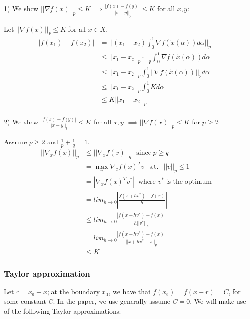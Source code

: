 \documentclass{article}
\begin{document}
1) We show $||\nabla f(x)||_p \leq K \implies \frac{|f(x)-f(y)|}{||x-y||_p} \leq K$ for all $x,y$:

Let $||\nabla f(x)||_p \leq K$ for all $x \in X$.
\begin{align*}
|f(x_1)-f(x_2)| &= || (x_1-x_2) \int_{0}^{1} \nabla f(\tilde{x}(\alpha)) d\alpha ||_p \\
&\leq || x_1-x_2 ||_p \cdot ||_p \int_{0}^{1} \nabla f(\tilde{x}(\alpha)) d\alpha || \\
&\leq || x_1-x_2 ||_p \int_{0}^{1} ||\nabla f(\tilde{x}(\alpha))||_p d\alpha \\
&\leq || x_1-x_2 ||_p \int_{0}^{1} K d\alpha \\
&\leq K || x_1-x_2 ||_p \\
\end{align*}

2) We show $\frac{|f(x)-f(y)|}{||x-y||_p} \leq K$ for all $x,y$ $\implies || \nabla f(x)||_p \leq K$ for $p\ge2$:

Assume $p\ge 2$ and $\frac{1}{p}+\frac{1}{q}=1$.
\begin{align*}
|| \nabla_x f(x) ||_p &\leq || \nabla_x f(x) ||_q \hspace{5pt} \text{ since $p \ge q$} \\
&= \max_v \nabla_x f(x)^T v \hspace{5pt} \text{ s.t. } \hspace{5pt} ||v||_p \leq 1 \\
&= \left| \nabla_x f(x)^T v^{*} \right| \hspace{3pt} \text{ where $v^{*}$ is the optimum} \\
&= lim_{h\to 0} \left|  \frac{f(x+hv^{*})-f(x)}{h} \right|  \\
&\leq lim_{h\to 0} \frac{\left|f(x+hv^{*})-f(x)\right|}{h|| v^{*}  ||_p}  \\
&= lim_{h\to 0}  \frac{\left|f(x+hv^{*})-f(x)\right|}{||x +  hv^{*} - x  ||_p}  \\
&\leq K 
\end{align*}

\subsubsection{Taylor approximation}

Let $r = x_0 - x$; at the boundary $x_0$, we have that $f(x_0)=f(x+r)=C$, for some constant $C$. In the paper, we use generally assume $C=0$. We will make use of the following Taylor approximations:
\end{document}
